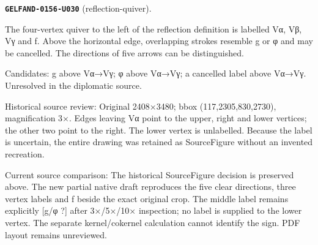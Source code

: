\par\noindent\leavevmode{}\label{GELFAND-0156-U030}\label{GELFAND-P001444:reflection-quiver}\textbf{\texttt{GELFAND-0156-U030}} (reflection-quiver).\nopagebreak[4]\par
The four-vertex quiver to the left of the reflection definition is labelled Vα, Vβ, Vγ and f. Above the horizontal edge, overlapping strokes resemble g or φ and may be cancelled. The directions of five arrows can be distinguished.\par
Candidates: g above Vα→Vγ; φ above Vα→Vγ; a cancelled label above Vα→Vγ. Unresolved in the diplomatic source.\par
Historical source review: Original 2408×3480; bbox (117,2305,830,2730), magnification 3×. Edges leaving Vα point to the upper, right and lower vertices; the other two point to the right. The lower vertex is unlabelled. Because the label is uncertain, the entire drawing was retained as SourceFigure without an invented recreation.\par
Current source comparison: The historical SourceFigure decision is preserved above. The new partial native draft reproduces the five clear directions, three vertex labels and f beside the exact original crop. The middle label remains explicitly [g/φ ?] after 3×/5×/10× inspection; no label is supplied to the lower vertex. The separate kernel/cokernel calculation cannot identify the sign. PDF layout remains unreviewed.\par\medskip
